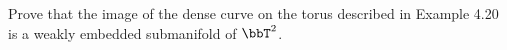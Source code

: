 Prove that the image of the dense curve on the torus described in Example 4.20 is a weakly embedded submanifold of $\bbT^2$.
